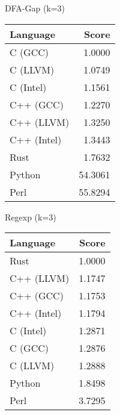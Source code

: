 \begin{subtable}{0.33\textwidth}
    \centering
    \caption{DFA-Gap (k=3)}
    \label{table:runtime:dfa_gap(3)}
    \begin{tabular}{|l|r|}
        \hline
        Language & Score \\
        \hline
        C (GCC) & 1.0000 \\
        C (LLVM) & 1.0749 \\
        C (Intel) & 1.1561 \\
        C++ (GCC) & 1.2270 \\
        C++ (LLVM) & 1.3250 \\
        C++ (Intel) & 1.3443 \\
        Rust & 1.7632 \\
        Python & 54.3061 \\
        Perl & 55.8294 \\
        \hline
    \end{tabular}
\end{subtable}%
\begin{subtable}{0.33\textwidth}
    \centering
    \caption{Regexp (k=3)}
    \label{table:runtime:regexp(3)}
    \begin{tabular}{|l|r|}
        \hline
        Language & Score \\
        \hline
        Rust & 1.0000 \\
        C++ (LLVM) & 1.1747 \\
        C++ (GCC) & 1.1753 \\
        C++ (Intel) & 1.1794 \\
        C (Intel) & 1.2871 \\
        C (GCC) & 1.2876 \\
        C (LLVM) & 1.2888 \\
        Python & 1.8498 \\
        Perl & 3.7295 \\
        \hline
    \end{tabular}
\end{subtable}
